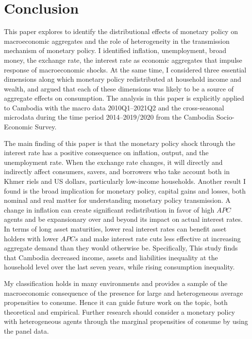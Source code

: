\documentclass[11pt,letterpaper]{article}
\begin{document}
\section{Conclusion}\label{sec:conclusion}
This paper explores to identify the distributional effects of monetary policy on macroeconomic aggregates and the role of heterogeneity in the transmission mechanism of monetary policy. I identified inflation, unemployment, broad money, the exchange rate, the interest rate as economic aggregates that impulse response of macroeconomic shocks. At the same time, I considered three essential dimensions along which monetary policy redistributed at household income and wealth, and argued that each of these dimensions was likely to be a source of aggregate effects on consumption. The analysis in this paper is explicitly applied to Cambodia with the macro data 2010Q1--2021Q2 and the cross-seasonal microdata during the time period 2014--2019/2020 from the Cambodia Socio-Economic Survey.

The main finding of this paper is that the monetary policy shock through the interest rate has a positive consequence on inflation, output, and the unemployment rate. When the exchange rate changes, it will directly and indirectly affect consumers, savers, and borrowers who take account both in Khmer riels and US dollars, particularly low-income households. Another result I found is the broad implication for monetary policy, capital gains and losses, both nominal and real matter for understanding monetary policy transmission. A change in inflation can create significant redistribution in favor of high $APC$ agents and be expansionary over and beyond its impact on actual interest rates. In terms of long asset maturities, lower real interest rates can benefit asset holders with lower $APCs$ and make interest rate cuts less effective at increasing aggregate demand than they would otherwise be. Specifically, This study finds that Cambodia decreased income, assets and liabilities inequality at the household level over the last seven years, while rising consumption inequality. 

My classification holds in many environments and provides a sample of the macroeconomic consequence of the presence for large and heterogeneous average propensities to consume. Hence it can guide future work on the topic, both theoretical and empirical. Further research should consider a monetary policy with heterogeneous agents through the marginal propensities of consume by using the panel data. 
      
\clearpage	
{\small
	
}	




\end{document}

